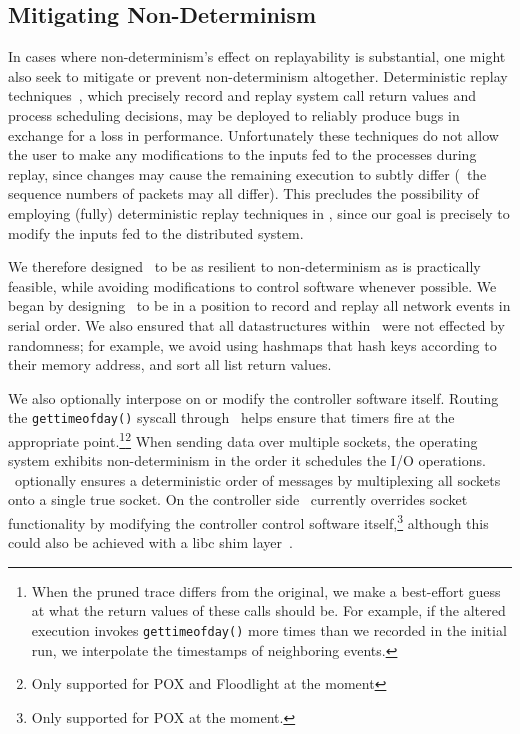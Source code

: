 \subsection{Mitigating Non-Determinism}
\label{subsec:mitigating}

In cases where non-determinism's effect on replayability is substantial,
one might also seek to mitigate or prevent non-determinism altogether.
Deterministic replay techniques~\cite{Dunlap:2002:REI:844128.844148,Geels:2006:RDD:1267359.1267386},
which precisely record and replay system call return values and process
scheduling decisions,
may be deployed to reliably produce bugs in exchange for a loss in performance.
Unfortunately these techniques do not allow the user to make any modifications to the inputs fed to the
processes during replay, since changes may cause the remaining execution to
subtly differ (\eg~the sequence numbers of packets may all differ).
This precludes the possibility of employing (fully) deterministic replay techniques in
\projectname, since our goal is precisely to modify the inputs fed to the
distributed system.

We therefore designed \projectname~to be as resilient to non-determinism as is
practically feasible, while avoiding modifications to control software whenever possible.
We began by designing \projectname~to be in a position to
record and replay all network events in serial order. We also ensured that all
datastructures within \projectname~were not effected by randomness; for example,
we avoid using hashmaps that hash keys according to their memory address,
and sort all list return values.

We also optionally interpose on or modify the controller software itself.
Routing the {\tt gettimeofday()} syscall through \projectname~helps ensure that timers fire
at the appropriate point.\footnote{When the pruned trace differs from the original, we make a
best-effort guess at what the return values of these calls should be. For example,
if the altered execution invokes {\tt gettimeofday()} more times than we recorded
in the initial run, we interpolate the timestamps of neighboring events.}\footnote{Only supported for POX and Floodlight at the moment}
When sending data over multiple sockets, the operating system exhibits
non-determinism in the order it schedules the I/O operations.
\projectname~optionally ensures a deterministic order of messages
by multiplexing all sockets
onto a single true socket. On the controller side \projectname~currently
overrides socket functionality by modifying the controller control
software itself,\footnote{Only supported for POX at the moment.} although this
could also be achieved with a libc shim layer~\cite{Geels:2006:RDD:1267359.1267386}.

